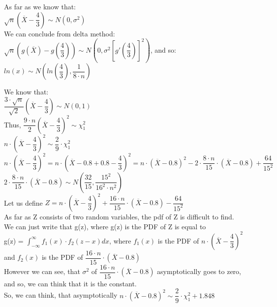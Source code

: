 \documentclass[12pt]{article}
\begin{document}
\begin{list}{()~}{}
As far as we know that:\\
$\sqrt{n}\left(\overline{X} - \dfrac{4}{3}\right) \sim N(0,\sigma^2)$\\
We can conclude from delta method:\\
$\sqrt{n} \left(g(\overline{X}) - g\left(\dfrac{4}{3}\right)\right) \sim N\left(0, \sigma^2 \left[ g'\left(\dfrac{4}{3}\right) \right]^2\right)$, and so:\\
$ln\left(x\right) \sim N\left(ln\left(\dfrac{4}{3}\right), \dfrac{1}{8 \cdot n}\right)$
\item
We know that: \\
$\dfrac{3 \cdot \sqrt{n}}{\sqrt{2}} \left(\overline{X} - \dfrac{4}{3}\right) \sim N(0,1)$\\
Thus, $\dfrac{9 \cdot n}{2}\left(\overline{X} - \dfrac{4}{3}\right)^2 \sim \chi_1^2$\\
$n \cdot \left(\overline{X} - \dfrac{4}{3}\right)^2 \sim \dfrac{2}{9} \cdot \chi_1^2$\\
$n \cdot \left(\overline{X} - \dfrac{4}{3}\right)^2 = n \cdot \left(\overline{X} - 0.8 + 0.8 - \dfrac{4}{3}\right)^2 = n \cdot \left(\overline{X} - 0.8\right)^2 - 2 \cdot \dfrac{8 \cdot n}{15} \cdot \left(\overline{X} - 0.8\right) + \dfrac{64}{15^2}$\\
$2 \cdot \dfrac{8 \cdot n}{15} \cdot \left(\overline{X} - 0.8\right) \sim N\left(\dfrac{32}{15}, \dfrac{15^2}{16^2 \cdot n^2}\right)$\\
Let us define $Z = n \cdot \left(\overline{X} - \dfrac{4}{3}\right)^2 + \dfrac{16 \cdot n}{15} \cdot \left(\overline{X} - 0.8\right) - \dfrac{64}{15^2}$\\
As far as Z consists of two random variables, the pdf of Z is difficult to find.\\
We can just write that g(z), where g(z) is the PDF of Z is equal to\\ g(z) = $\int^\infty_{-\infty} f_1(x) \cdot f_2(z - x) dx$, where $f_1(x)$ is the PDF of $n \cdot \left(\overline{X} - \dfrac{4}{3}\right)^2$ and $f_2(x)$ is the PDF of $\dfrac{16 \cdot n}{15} \cdot \left(\overline{X} - 0.8\right)$\\
However we can see, that $\sigma^2$ of $\dfrac{16 \cdot n}{15} \cdot \left(\overline{X} - 0.8\right)$ asymptotically goes to zero, and so, we can think that it is the constant.\\
So, we can think, that asymptotically $n \cdot \left(\overline{X} - 0.8\right)^2 \sim \dfrac{2}{9} \cdot \chi_1^2 + 1.848$
\end{list}
\end{document}
